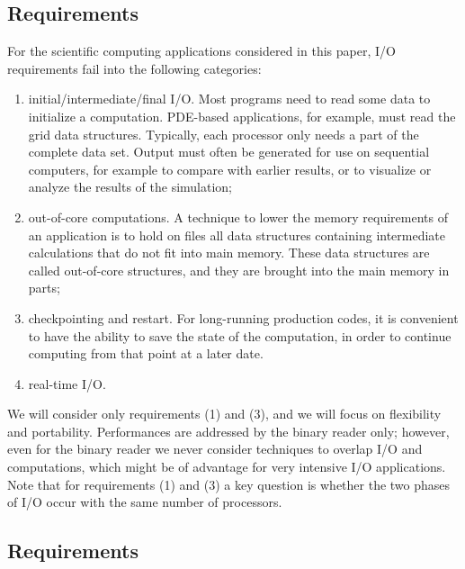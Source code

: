 \documentclass[11pt,relax]{SANDreport}
\begin{document}
\subsection{Requirements}

For the scientific computing applications considered in this paper, I/O
requirements fail into the following categories:
\begin{enumerate}
\item initial/intermediate/final I/O. Most programs need to read some data to
initialize a computation. PDE-based applications, for example, must read the
grid data structures. Typically, each processor only needs a part of the
complete data set. Output must often be generated for use on sequential
computers, for example to compare with earlier results, or to visualize or
analyze the results of the simulation;
\item out-of-core computations. A technique to lower the memory requirements
of an application is to hold on files all data structures containing
intermediate calculations that do not fit into main memory. These data
structures are called out-of-core structures, and they are brought into the
main memory in parts;
\item checkpointing and restart. For long-running production codes, it is
convenient to have the ability to save the state of the computation, in order
to continue computing from that point at a later date.
\item real-time I/O.
\end{enumerate}
We will consider only requirements (1) and (3), and we will focus on
flexibility and portability. Performances are addressed by the binary reader
only; however, even for the binary reader we never consider techniques to
overlap I/O and computations, which
might be of advantage for very intensive I/O applications. Note that for
requirements (1) and (3) a key question is whether the two phases of I/O occur
with the same number of processors.

\subsection{Requirements}
\end{document}
